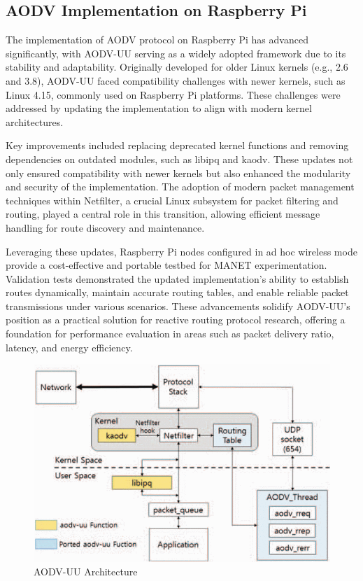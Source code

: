 \documentclass[]{nsm-thesis}
\begin{document}
\subsection{AODV Implementation on Raspberry Pi}
The implementation of AODV protocol on Raspberry Pi has advanced significantly, with AODV-UU serving as a widely adopted framework due to its stability and adaptability. Originally developed for older Linux kernels (e.g., 2.6 and 3.8), AODV-UU faced compatibility challenges with newer kernels, such as Linux 4.15, commonly used on Raspberry Pi platforms. These challenges were addressed by updating the implementation to align with modern kernel architectures.

Key improvements included replacing deprecated kernel functions and removing dependencies on outdated modules, such as libipq and kaodv. These updates not only ensured compatibility with newer kernels but also enhanced the modularity and security of the implementation. The adoption of modern packet management techniques within Netfilter, a crucial Linux subsystem for packet filtering and routing, played a central role in this transition, allowing efficient message handling for route discovery and maintenance.

Leveraging these updates, Raspberry Pi nodes configured in ad hoc wireless mode provide a cost-effective and portable testbed for MANET experimentation. Validation tests demonstrated the updated implementation's ability to establish routes dynamically, maintain accurate routing tables, and enable reliable packet transmissions under various scenarios. These advancements solidify AODV-UU’s position as a practical solution for reactive routing protocol research, offering a foundation for performance evaluation in areas such as packet delivery ratio, latency, and energy efficiency.\cite{9059478}

\begin{figure}[h]
\graphicspath{{/image/}} %
\centering
\includegraphics[scale=0.4]{image/AODV-UU.png} %
\caption{AODV-UU Architecture \cite{9059478}}
\label{fig:mesh6} %
\end{figure}
\end{document}
